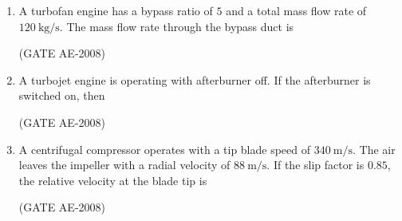 \documentclass[journal,12pt,onecolumn]{IEEEtran}
\theoremstyle{remark}
\begin{document}
\begin{enumerate}
    \quad

\item A turbofan engine has a bypass ratio of $5$ and a total mass flow rate of $120 \ \mathrm{kg/s}$. The mass flow rate through the bypass duct is
\begin{enumerate}
\end{enumerate}
 \hfill(GATE AE-2008)

    \quad

\item A turbojet engine is operating with afterburner off. If the afterburner is switched on, then  
\begin{enumerate}
\end{enumerate}
 \hfill(GATE AE-2008)

    \quad

\item A centrifugal compressor operates with a tip blade speed of $340 \ \mathrm{m/s}$. The air leaves the impeller with a radial velocity of $88 \ \mathrm{m/s}$. If the slip factor is $0.85$, the relative velocity at the blade tip is  
\begin{enumerate}
\end{enumerate}
 \hfill(GATE AE-2008)

    \quad


\end{enumerate}
\end{document}
